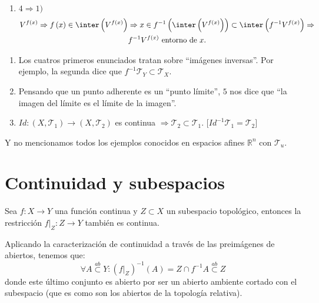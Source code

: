 \begin{demo}
\begin{enumerate}
    \item $4 \Rightarrow 1)$
    \begin{gather*}
        V^{f\left( x \right)} \Rightarrow f\left( x \right) \in \inter\left( V^{f\left( x \right)} \right) \Rightarrow x \in f^{-1}\left( \inter\left( V^{f\left( x \right)} \right) \right) \subset \inter\left( f^{-1}V^{f\left( x \right)} \right) \Rightarrow \\
        f^{-1}V^{f\left( x \right) } \text{ entorno de } x.
    \end{gather*}
\end{enumerate}
\end{demo}

\begin{obs}
\begin{enumerate}
    \item Los cuatros primeros enunciados tratan sobre ``imágenes inversas''. Por ejemplo, la segunda dice que $f^{-1}\mathcal{T}_Y \subset \mathcal{T}_X$.
    \item Pensando que un punto adherente es un ``punto límite'', $5$ nos dice que ``la imagen del límite es el límite de la imagen''.
    \item $Id: \left( X, \mathcal{T}_1 \right) \rightarrow \left( X, \mathcal{T}_2 \right)$ es continua $\Rightarrow \mathcal{T}_2 \subset \mathcal{T}_1$. [$Id^{-1}\mathcal{T}_1 = \mathcal{T}_2]$
\end{enumerate}
Y no mencionamos todos los ejemplos conocidos en espacios afines $\mathbb{R}^n$ con $\mathcal{T}_u$.
\end{obs}

\section{Continuidad y subespacios}%
\label{sec:continuidad_y_subespacios}
\begin{prop}
Sea $f: X \rightarrow Y$ una función continua y $Z \subset X$ un subespacio topológico, entonces la restricción $f|_Z : Z \rightarrow Y$ también es continua.
\end{prop}
\begin{demo}
Aplicando la caracterización de continuidad a través de las preimágenes de abiertos, tenemos que:
\[
\forall A \stackrel{ab}{\subset} Y : \left( f|_Z \right)^{-1} \left( A \right) = Z \cap f^{-1} A \stackrel{ab}{\subset} Z
\]
donde este último conjunto es abierto por ser un abierto ambiente cortado con el subespacio (que es como son los abiertos de la topología relativa).
\end{demo}

